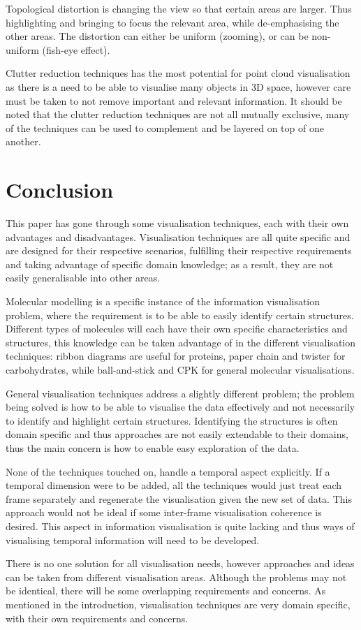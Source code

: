 \documentclass[twocolumn,a4paper]{article}
\begin{document}
Topological distortion is changing the view so that certain areas are larger.
Thus highlighting and bringing to focus the relevant area, while de-emphasising
the other areas. The distortion can either be uniform (zooming), or can be
non-uniform (fish-eye effect).

Clutter reduction techniques has the most potential for point cloud
visualisation as there is a need to be able to visualise many objects in 3D
space, however care must be taken to not remove important and relevant
information. It should be noted that the clutter reduction techniques are not
all mutually exclusive, many of the techniques can be used to complement and be
layered on top of one another.


\section{Conclusion}
This paper has gone through some visualisation techniques, each with their own
advantages and disadvantages. Visualisation techniques are all quite specific
and are designed for their respective scenarios, fulfilling their respective
requirements and taking advantage of specific domain knowledge; as a result,
they are not easily generalisable into other areas.

Molecular modelling is a specific instance of the information visualisation
problem, where the requirement is to be able to easily identify certain
structures. Different types of molecules will each have their own specific
characteristics and structures, this knowledge can be taken advantage of in the
different visualisation techniques: ribbon diagrams are useful for proteins,
paper chain and twister for carbohydrates, while ball-and-stick and CPK for
general molecular visualisations.

General visualisation techniques address a slightly different problem; the
problem being solved is how to be able to visualise the data effectively and
not necessarily to identify and highlight certain structures. Identifying the
structures is often domain specific and thus approaches are not easily
extendable to their domains, thus the main concern is how to enable easy
exploration of the data.

None of the techniques touched on, handle a temporal aspect explicitly. If a
temporal dimension were to be added, all the techniques would just treat each
frame separately and regenerate the visualisation given the new set of data.
This approach would not be ideal if some inter-frame visualisation coherence is
desired. This aspect in information visualisation is quite lacking and thus ways
of visualising temporal information will need to be developed.

There is no one solution for all visualisation needs, however approaches and
ideas can be taken from different visualisation areas. Although the problems
may not be identical, there will be some overlapping requirements and concerns.
As mentioned in the introduction, visualisation techniques are very domain
specific, with their own requirements and concerns.



\end{document}
